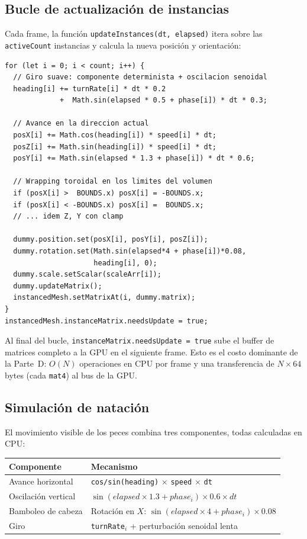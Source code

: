 \documentclass[12pt,a4paper]{article}
\begin{document}
\subsection{Bucle de actualización de instancias}

Cada frame, la función \texttt{updateInstances(dt, elapsed)} itera sobre las
\texttt{activeCount} instancias y calcula la nueva posición y orientación:

\begin{lstlisting}[style=glsl, language={}]
for (let i = 0; i < count; i++) {
  // Giro suave: componente determinista + oscilacion senoidal
  heading[i] += turnRate[i] * dt * 0.2
             +  Math.sin(elapsed * 0.5 + phase[i]) * dt * 0.3;

  // Avance en la direccion actual
  posX[i] += Math.cos(heading[i]) * speed[i] * dt;
  posZ[i] += Math.sin(heading[i]) * speed[i] * dt;
  posY[i] += Math.sin(elapsed * 1.3 + phase[i]) * dt * 0.6;

  // Wrapping toroidal en los limites del volumen
  if (posX[i] >  BOUNDS.x) posX[i] = -BOUNDS.x;
  if (posX[i] < -BOUNDS.x) posX[i] =  BOUNDS.x;
  // ... idem Z, Y con clamp

  dummy.position.set(posX[i], posY[i], posZ[i]);
  dummy.rotation.set(Math.sin(elapsed*4 + phase[i])*0.08,
                     heading[i], 0);
  dummy.scale.setScalar(scaleArr[i]);
  dummy.updateMatrix();
  instancedMesh.setMatrixAt(i, dummy.matrix);
}
instancedMesh.instanceMatrix.needsUpdate = true;
\end{lstlisting}

Al final del bucle, \texttt{instanceMatrix.needsUpdate = true} sube el buffer de
matrices completo a la GPU en el siguiente frame. Esto es el costo dominante de la
Parte~D: $O(N)$ operaciones en CPU por frame y una transferencia de $N \times 64$
bytes (cada \texttt{mat4}) al bus de la GPU.

\subsection{Simulación de natación}

El movimiento visible de los peces combina tres componentes, todas calculadas en CPU:

\begin{center}
\begin{tabular}{ll}
  \toprule
  Componente & Mecanismo \\
  \midrule
  Avance horizontal & \texttt{cos/sin(heading)} $\times$ \texttt{speed} $\times$ \texttt{dt} \\
  Oscilación vertical & $\sin(elapsed \times 1.3 + phase_i) \times 0.6 \times dt$ \\
  Bamboleo de cabeza & Rotación en $X$: $\sin(elapsed \times 4 + phase_i) \times 0.08$ \\
  Giro & \texttt{turnRate}$_i$ + perturbación senoidal lenta \\
  \bottomrule
\end{tabular}
\end{center}
\end{document}
